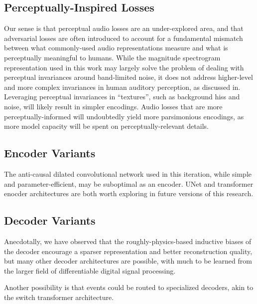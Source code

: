 \documentclass[9pt,conference]{IEEEtran}
\begin{document}
\subsection{Perceptually-Inspired Losses}
\label{ssec:better_perceptual_losses}

Our sense is that perceptual audio losses are an under-explored area, and
that adversarial losses are often introduced to account for a fundamental mismatch 
between what commonly-used audio representations measure and what is 
perceptually meaningful to humans.  While the magnitude spectrogram 
representation used in this work may largely solve the problem of 
dealing with perceptual invariances around band-limited noise, it does not address higher-level and 
more complex invariances in human auditory perception, as discussed in\cite{cce142f4ee7344d48772f4406d19391d}.
Leveraging perceptual invariances in ``textures'', such as background hiss and noise, 
will likely result in simpler encodings.  Audio losses that are 
more perceptually-informed will undoubtedly yield more parsimonious encodings, 
as more model capacity will be spent on perceptually-relevant details.

\subsection{Encoder Variants}
\label{ssec:encoder_variants}

The anti-causal dilated convolutional network used in this iteration, 
while simple and parameter-efficient, may be suboptimal as an encoder.  
UNet and transformer enocder architectures are both worth exploring in 
future versions of this research.

\subsection{Decoder Variants}
\label{ssec:decoder_variants}

Anecdotally, we have observed that the roughly-physics-based 
inductive biases of the decoder encourage a sparser representation and 
better reconstruction quality, but many other decoder architectures are 
possible, with much to be learned from the larger field 
of differentiable digital signal processing\cite{engel2020ddspdifferentiabledigitalsignal}.

Another possibility is that events could be routed to specialized decoders, akin to the 
switch transformer architecture\cite{fedus2022switchtransformersscalingtrillion}.
\end{document}
